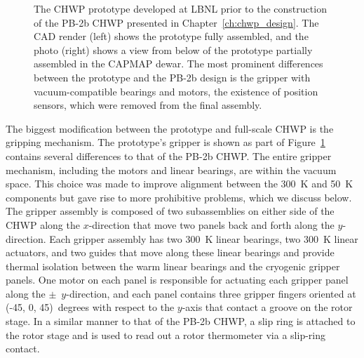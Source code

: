 \begin{figure}[!t]
    \centering
    \caption[The CHWP prototype developed at LBNL.]{The CHWP prototype developed at LBNL prior to the construction of the PB-2b CHWP presented in Chapter~\ref{ch:chwp_design}. The CAD render (left) shows the prototype fully assembled, and the photo (right) shows a view from below of the prototype partially assembled in the CAPMAP dewar. The most prominent differences between the prototype and the PB-2b design is the gripper with vacuum-compatible bearings and motors, the existence of position sensors, which were removed from the final assembly.}
    \label{fig:chwp_prototype}
\end{figure}

The biggest modification between the prototype and full-scale CHWP is the gripping mechanism. The prototype's gripper is shown as part of Figure~\ref{fig:chwp_prototype} contains several differences to that of the PB-2b CHWP. The entire gripper mechanism, including the motors and linear bearings, are within the vacuum space. This choice was made to improve alignment between the 300~K and 50~K components but gave rise to more prohibitive problems, which we discuss below. The gripper assembly is composed of two subassemblies on either side of the CHWP along the $x$-direction that move two panels back and forth along the $y$-direction. Each gripper assembly has two 300~K linear bearings, two 300~K linear actuators, and two guides that move along these linear bearings and provide thermal isolation between the warm linear bearings and the cryogenic gripper panels. One motor on each panel is responsible for actuating each gripper panel along the $\pm$~$y$-direction, and each panel contains three gripper fingers oriented at (-45, 0, 45)~degrees with respect to the $y$-axis that contact a groove on the rotor stage. In a similar manner to that of the PB-2b CHWP, a slip ring is attached to the rotor stage and is used to read out a rotor thermometer via a slip-ring contact.

